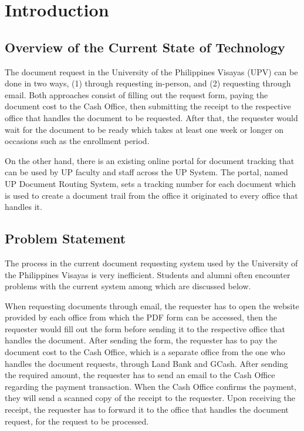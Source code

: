\chapter{Introduction}
\label{sec:researchdesc}    %

\section{Overview of the Current State of Technology}
\label{sec:overview}

The document request in the University of the Philippines Visayas (UPV) can be done in two ways, (1) through requesting in-person, and (2) requesting through email. Both approaches consist of filling out the request form, paying the document cost to the Cash Office, then submitting the receipt to the respective office that handles the document to be requested. After that, the requester would wait for the document to be ready which takes at least one week or longer on occasions such as the enrollment period.

On the other hand, there is an existing online portal for document tracking that can be used by UP faculty and staff across the UP System. The portal, named UP Document Routing System, sets a tracking number for each document which is used to create a document trail from the office it originated to every office that handles it.

\section{Problem Statement}
The process in the current document requesting system used by the University of the Philippines Visayas is very inefficient. Students and alumni often encounter problems with the current system among which are discussed below.

When requesting documents through email, the requester has to open the website provided by each office from which the PDF form can be accessed, then the requester would fill out the form before sending it to the respective office that handles the document. After sending the form, the requester has to pay the document cost to the Cash Office, which is a separate office from the one who handles the document requests, through Land Bank and GCash. After sending the required amount, the requester has to send an email to the Cash Office regarding the payment transaction. When the Cash Office confirms the payment, they will send a scanned copy of the receipt to the requester. Upon receiving the receipt, the requester has to forward it to the office that handles the document request, for the request to be processed.

